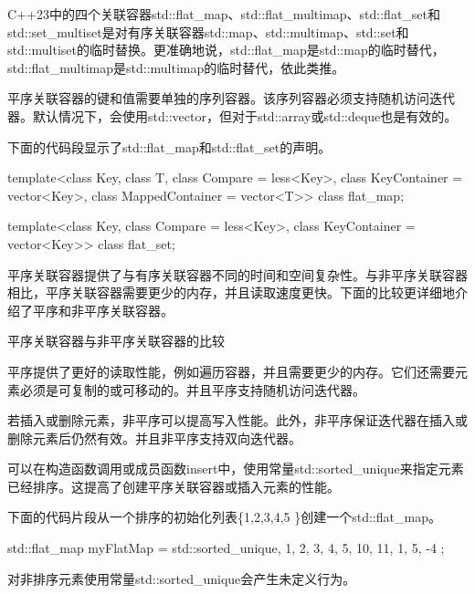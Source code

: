 C++23中的四个关联容器std::flat\_map、std::flat\_multimap、std::flat\_set和std::set\_multiset是对有序关联容器std::map、std::multimap、std::set和std::multiset的临时替换。更准确地说，std::flat\_map是std::map的临时替代，std::flat\_multimap是std::multimap的临时替代，依此类推。

平序关联容器的键和值需要单独的序列容器。该序列容器必须支持随机访问迭代器。默认情况下，会使用std::vector，但对于std::array或std::deque也是有效的。

下面的代码段显示了std::flat\_map和std::flat\_set的声明。


\begin{cpp}
template<class Key, class T,
	class Compare = less<Key>,
	class KeyContainer = vector<Key>, class MappedContainer = vector<T>>
class flat_map;

template<class Key,
	class Compare = less<Key>,
	class KeyContainer = vector<Key>>
class flat_set;
\end{cpp}

平序关联容器提供了与有序关联容器不同的时间和空间复杂性。与非平序关联容器相比，平序关联容器需要更少的内存，并且读取速度更快。下面的比较更详细地介绍了平序和非平序关联容器。


\begin{myTip}{平序关联容器与非平序关联容器的比较}

平序提供了更好的读取性能，例如遍历容器，并且需要更少的内存。它们还需要元素必须是可复制的或可移动的。并且平序支持随机访问迭代器。

若插入或删除元素，非平序可以提高写入性能。此外，非平序保证迭代器在插入或删除元素后仍然有效。并且非平序支持双向迭代器。
\end{myTip}



可以在构造函数调用或成员函数insert中，使用常量std::sorted\_unique来指定元素已经排序。这提高了创建平序关联容器或插入元素的性能。

下面的代码片段从一个排序的初始化列表\{1,2,3,4,5 \}创建一个std::flat\_map。

\begin{cpp}
std::flat_map myFlatMap = { std::sorted_unique, {1, 2, 3, 4, 5}, {10, 11, 1, 5, -4} };
\end{cpp}

对非排序元素使用常量std::sorted\_unique会产生未定义行为。













